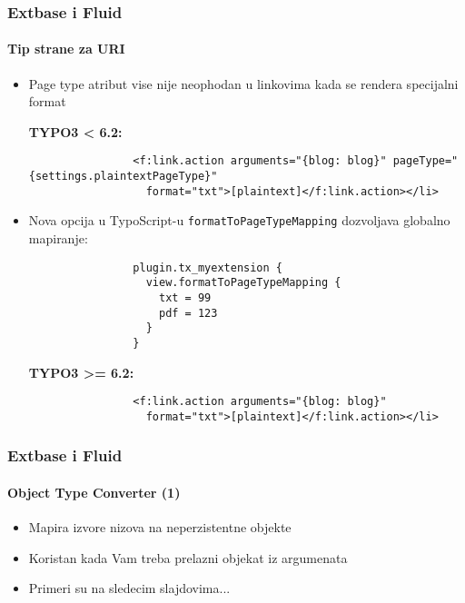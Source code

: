 
\begin{frame}[fragile]
	\frametitle{Extbase i Fluid}
	\framesubtitle{Tip strane za URI}

	\lstset{
		basicstyle=\tiny\ttfamily
	}

	\begin{itemize}
		\item Page type atribut vise nije neophodan u linkovima kada se rendera specijalni format

			\smaller\textbf{TYPO3 < 6.2:}\normalsize
			\begin{lstlisting}
				<f:link.action arguments="{blog: blog}" pageType="{settings.plaintextPageType}"
				  format="txt">[plaintext]</f:link.action></li>
			\end{lstlisting}

		\item Nova opcija u TypoScript-u \texttt{formatToPageTypeMapping} dozvoljava globalno mapiranje:

			\begin{lstlisting}
				plugin.tx_myextension {
				  view.formatToPageTypeMapping {
				    txt = 99
				    pdf = 123
				  }
				}
			\end{lstlisting}

			\smaller\textbf{TYPO3 >= 6.2:}\normalsize
			\begin{lstlisting}
				<f:link.action arguments="{blog: blog}"
				  format="txt">[plaintext]</f:link.action></li>
			\end{lstlisting}

	\end{itemize}

\end{frame}


\begin{frame}[fragile]
	\frametitle{Extbase i Fluid}
	\framesubtitle{Object Type Converter (1)}

	\begin{itemize}
		\item Mapira izvore nizova na neperzistentne objekte
		\item Koristan kada Vam treba prelazni objekat iz argumenata 
		\item Primeri su na sledecim slajdovima...

	\end{itemize}

\end{frame}

